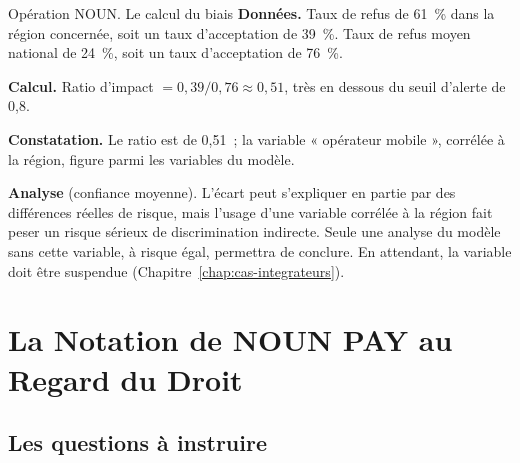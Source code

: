 \begin{boxscenario}{Opération NOUN. Le calcul du biais}
\textbf{Données.} Taux de refus de 61~\% dans la région concernée, soit un
taux d'acceptation de 39~\%. Taux de refus moyen national de 24~\%, soit un
taux d'acceptation de 76~\%.

\medskip
\textbf{Calcul.} Ratio d'impact $= 0{,}39 / 0{,}76 \approx 0{,}51$, très en
dessous du seuil d'alerte de 0,8.

\medskip
\textbf{Constatation.} Le ratio est de 0,51~; la variable « opérateur
mobile », corrélée à la région, figure parmi les variables du modèle.

\medskip
\textbf{Analyse} (confiance moyenne). L'écart peut s'expliquer en partie
par des différences réelles de risque, mais l'usage d'une variable
corrélée à la région fait peser un risque sérieux de discrimination
indirecte. Seule une analyse du modèle sans cette variable, à risque égal,
permettra de conclure. En attendant, la variable doit être suspendue
(Chapitre~\ref{chap:cas-integrateurs}).
\end{boxscenario}

\section{La Notation de NOUN PAY au Regard du Droit}
\label{sec:c19-noun}

\subsection{Les questions à instruire}

